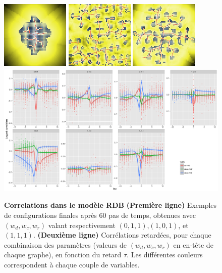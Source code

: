 \begin{figure}%
\centering
\includegraphics[width=0.29\textwidth]{figures/caus_ex_60_wdens0_wroad1_wcenter1_seed272727}
\includegraphics[width=0.29\textwidth]{figures/caus_ex_60_wdens1_wroad1_wcenter0_seed272727}
\includegraphics[width=0.29\textwidth]{figures/caus_ex_60_wdens1_wroad1_wcenter1_seed272727}\\\vspace{0.2cm}
\includegraphics[width=\textwidth]{figures/caus_laggedcorrs_facetextreme}
\caption{\textbf{Correlations dans le modèle RDB} \textbf{(Première ligne)} Exemples de configurations finales après 60 pas de temps, obtenues avec $(w_{d},w_{c},w_{r})$ valant respectivement $(0,1,1)$,$(1,0,1)$, et $(1,1,1)$. \textbf{(Deuxième ligne)} Corrélations retardées, pour chaque combinaison des paramètres (valeurs de $(w_{d},w_{c},w_{r})$ en en-tête de chaque graphe), en fonction du retard $\tau$. Les différentes couleurs correspondent à chaque couple de variables.}
\label{fig:exrdb}
\end{figure}




